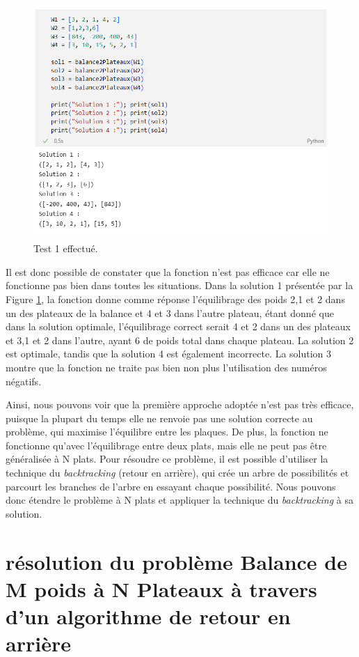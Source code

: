 \documentclass[12pt]{article} %
\begin{document}
\FloatBarrier
\begin{figure}[!h]
\centering
\includegraphics[width = 0.7\linewidth]{tests/1.png}
\caption{Test 1 effectué.}
\label{fig:test1}
\end{figure}
\FloatBarrier

Il est donc possible de constater que la fonction n'est pas efficace car elle ne fonctionne pas bien dans toutes les situations. Dans la solution 1 présentée par la Figure \ref{fig:test1}, la fonction donne comme réponse l'équilibrage des poids 2,1 et 2 dans un des plateaux de la balance et 4 et 3 dans l'autre plateau, étant donné que dans la solution optimale, l'équilibrage correct serait 4 et 2 dans un des plateaux et 3,1 et 2 dans l'autre, ayant 6 de poids total dans chaque plateau. La solution 2 est optimale, tandis que la solution 4 est également incorrecte. La solution 3 montre que la fonction ne traite pas bien non plus l'utilisation des numéros négatifs. 

Ainsi, nous pouvons voir que la première approche adoptée n'est pas très efficace, puisque la plupart du temps elle ne renvoie pas une solution correcte au problème, qui maximise l'équilibre entre les plaques. De plus, la fonction ne fonctionne qu'avec l'équilibrage entre deux plats, mais elle ne peut pas être généralisée à N plats. Pour résoudre ce problème, il est possible d'utiliser la technique du \textit{backtracking} (retour en arrière), qui crée un arbre de possibilités et parcourt les branches de l'arbre en essayant chaque possibilité.  Nous pouvons donc étendre le problème à N plats et appliquer la technique du \textit{backtracking} à sa solution.

\section{résolution du problème Balance de M poids à N Plateaux à travers d'un algorithme de retour en arrière}
\end{document}
